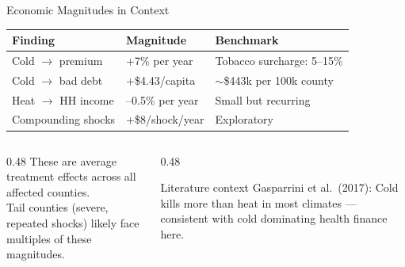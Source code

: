 \documentclass[aspectratio=169,11pt]{beamer}
\newcommand{\tealtext}[1]{{\color{Teal}#1}}
\newcommand{\graytext}[1]{{\color{WarmGray}#1}}
\begin{document}
\begin{frame}{Economic Magnitudes in Context}
  \begin{center}
    \small
    \begin{tabular}{lll}
      \toprule
      \textbf{Finding} & \textbf{Magnitude} & \textbf{Benchmark} \\
      \midrule
      Cold $\rightarrow$ premium & +7\% per year & Tobacco surcharge: 5--15\% \\
      Cold $\rightarrow$ bad debt & +\$4.43/capita & $\sim$\$443k per 100k county \\
      Heat $\rightarrow$ HH income & --0.5\% per year & Small but recurring \\
      Compounding shocks & +\$8/shock/year & \graytext{Exploratory} \\
      \bottomrule
    \end{tabular}
  \end{center}
  \vspace{0.6em}
  \begin{columns}[T]
    \begin{column}{0.48\textwidth}
      These are \tealtext{average treatment effects} across all affected counties.\\
      Tail counties (severe, repeated shocks) likely face multiples of these magnitudes.
    \end{column}
    \begin{column}{0.48\textwidth}
      \begin{exampleblock}{Literature context}
        \footnotesize
        Gasparrini et al.\ (2017): Cold kills more than heat in most climates --- consistent with cold dominating health finance here.
      \end{exampleblock}
    \end{column}
  \end{columns}
\end{frame}
\end{document}
